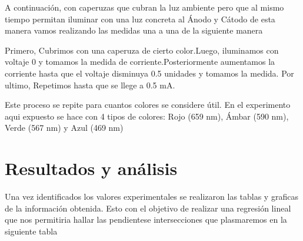 \documentclass[a4paper, amsfonts, amssymb, amsmath, reprint, showkeys, nofootinbib, twoside]{revtex4-1}
\begin{document}
A continuación, con caperuzas que cubran la luz ambiente pero que al mismo tiempo permitan iluminar con una luz concreta al Ánodo y Cátodo de esta manera vamos realizando las medidas una a una de la siguiente manera

Primero, Cubrimos con una caperuza de cierto color.Luego, iluminamos con voltaje 0 y tomamos la medida de corriente.Posteriormente aumentamos la corriente hasta que el voltaje disminuya 0.5 unidades y tomamos la medida. Por ultimo,  Repetimos hasta que se llege a 0.5 mA.

Este proceso se repite para cuantos colores se considere útil. En el experimento aqui expuesto se hace con 4 tipos de colores: Rojo (659 nm), Ámbar (590 nm), Verde (567 nm) y Azul (469 nm)
\section{Resultados y análisis}
Una vez identificados los valores experimentales se realizaron las tablas y graficas de la información obtenida. Esto con el objetivo de realizar una regresión lineal que nos permitiria hallar las pendientese intersecciones que plasmaremos en la siguiente tabla
\end{document}
